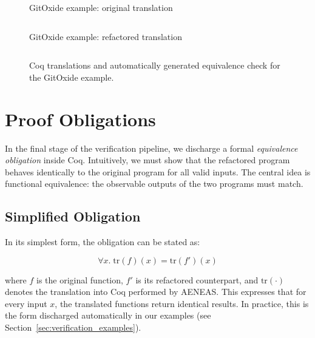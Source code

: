 \begin{figure}[ht]
  \centering
  \begin{minipage}{0.45\linewidth}
    \inputminted[linenos, breaklines, frame=none, fontsize=\footnotesize]{coq}{3_Chapter3/COQ_example/complex.v}
    \caption*{GitOxide example: original translation}
  \end{minipage}\hfill
  \begin{minipage}{0.45\linewidth}
    \inputminted[linenos, breaklines, frame=none, fontsize=\footnotesize]{coq}{3_Chapter3/COQ_example/complex_ref.v}
    \caption*{GitOxide example: refactored translation}
  \end{minipage}

  \vspace{1em}
  \inputminted[linenos, breaklines, frame=none, fontsize=\footnotesize]{coq}{3_Chapter3/COQ_example/complex_proof.v}
  \caption{Coq translations and automatically generated equivalence check for the GitOxide example.}
  \label{fig:coq_gitoxide}
\end{figure}

\section{Proof Obligations}
\label{sec:proof_obligations}

In the final stage of the verification pipeline, we discharge a formal
\textit{equivalence obligation} inside Coq. Intuitively, we must show that the
refactored program behaves identically to the original program for all valid
inputs. The central idea is functional equivalence: the observable outputs of
the two programs must match.

\subsection{Simplified Obligation}
In its simplest form, the obligation can be stated as:

\[
\forall x.\; \text{tr}(f)(x) = \text{tr}(f')(x)
\]

where \(f\) is the original function, \(f'\) is its refactored counterpart, and
\(\text{tr}(\cdot)\) denotes the translation into Coq performed by AENEAS. This expresses that
for every input \(x\), the translated functions return identical results. In practice, this is
the form discharged automatically in our examples (see
Section~\ref{sec:verification_examples}).

